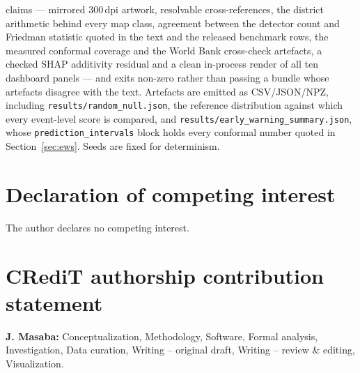 \documentclass[preprint,12pt]{elsarticle}
\begin{document}
claims --- mirrored 300\,dpi artwork, resolvable cross-references, the district
arithmetic behind every map class, agreement between the detector count and
Friedman statistic quoted in the text and the released benchmark rows, the
measured conformal coverage and the World Bank cross-check artefacts, a checked
SHAP additivity residual and a
clean in-process render of all ten dashboard panels --- and exits non-zero rather
than passing a bundle whose artefacts disagree with the text.
Artefacts are
emitted as CSV/JSON/NPZ, including \texttt{results/random\_null.json}, the
reference distribution against which every event-level score is compared, and
\texttt{results/early\_warning\_summary.json}, whose \texttt{prediction\_intervals}
block holds every conformal number quoted in Section~\ref{sec:ews}. Seeds
are fixed for determinism.

\section*{Declaration of competing interest}
The author declares no competing interest.

\section*{CRediT authorship contribution statement}
\textbf{J. Masaba:} Conceptualization, Methodology, Software, Formal analysis,
Investigation, Data curation, Writing -- original draft, Writing -- review \&
editing, Visualization.

\end{document}
